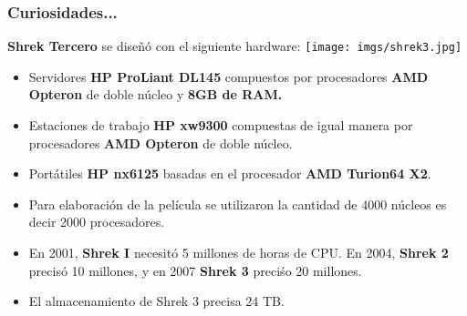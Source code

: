 \frame
{
\frametitle{Curiosidades...}
\textbf{Shrek Tercero} se diseñó con el siguiente hardware:
\hspace*{2cm} \texttt{[image: imgs/shrek3.jpg]}
\begin{itemize}
\item Servidores \textbf{HP ProLiant DL145} compuestos por procesadores \textbf{AMD Opteron} de doble núcleo y \textbf{8GB de RAM.}
\item Estaciones de trabajo \textbf{HP xw9300} compuestas de igual manera por procesadores \textbf{AMD Opteron} de doble núcleo.
\item Portátiles \textbf{HP nx6125} basadas en el procesador \textbf{AMD Turion64 X2}.
\item Para elaboración de la película se utilizaron la cantidad de 4000 núcleos es decir 2000 procesadores.
\item En 2001, \textbf{Shrek I} necesitó 5 millones de horas de CPU. En 2004, \textbf{Shrek 2 } precisó 10 millones, y en 2007 \textbf{Shrek 3} preciśo 20 millones.
\item El almacenamiento de Shrek 3 precisa 24 TB.
\end{itemize}
	\scriptsize {}
}
